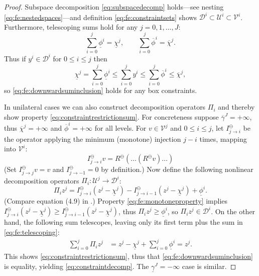 \documentclass[review,hidelinks,onefignum,onetabnum]{siamart220329}
\newcommand{\cV}{\mathcal{V}}
\newcommand{\minR}{R^{\bm{\ominus}}}
\begin{document}
\begin{proof}  Subspace decomposition \eqref{eq:subspacedecomp} holds---see nesting \eqref{eq:fe:nestedspaces}---and definition \eqref{eq:fe:constraintsets} shows $\mathcal{D}^i \subset \mathcal{U}^i \subset \cV^i$.  Furthermore, telescoping sums hold for any $j=0,1,\dots,J$:
\begin{equation}
\sum_{i=0}^j \underline{\phi}^i = \underline{\chi}^j, \qquad \sum_{i=0}^j \overline{\phi}^i = \overline{\chi}^j.  \label{eq:fe:telescoping}
\end{equation}
Thus if $y^i \in \mathcal{D}^i$ for $0 \le i \le j$ then
\begin{equation}
\underline{\chi}^j = \sum_{i=0}^j \underline{\phi}^i \le \sum_{i=0}^j y^i \le \sum_{i=0}^j \overline{\phi}^i \le \overline{\chi}^j, \label{eq:fe:lemmaordering}
\end{equation}
so \eqref{eq:fe:downwardsuminclusion} holds for any box constraints.

In unilateral cases we can also construct decomposition operators $\Pi_i$ and thereby show property \eqref{eq:constraintrestrictionsum}.  For concreteness suppose $\overline{\gamma}^J=+\infty$, thus $\overline{\chi}^j=+\infty$ and $\overline{\phi}^i = +\infty$ for all levels.  For $v\in \mathcal{V}^j$ and $0\le i \le j$, let $I_{j\to i}^\ominus$ be the operator applying the minimum (monotone) injection $j-i$ times, mapping into $\mathcal{V}^i$:
\begin{equation}
I_{j\to i}^\ominus v = \minR(\dots(\minR v)\dots)  \label{eq:fe:minimummaps}
\end{equation}
(Set $I_{j\to j}^\ominus v = v$ and $I_{j\to -1}^\ominus=0$ by definition.)  Now define the following nonlinear decomposition operators $\Pi_i:\mathcal{U}^j \to \mathcal{D}^i$:
\begin{equation}
\Pi_i z^j = I_{j\to i}^\ominus(z^j - \underline{\chi}^j) - I_{j\to i-1}^\ominus(z^j - \underline{\chi}^j) + \underline{\phi}^i.  \label{eq:fe:unilateraldecompositionoperator}
\end{equation}
(Compare equation (4.9) in \cite{GraeserKornhuber2009}.)  Property \eqref{eq:fe:monotoneproperty} implies $I_{j\to i}^\ominus(z^j - \underline{\chi}^j) \ge I_{j\to i-1}^\ominus(z^j - \underline{\chi}^j)$, thus $\Pi_i z^j \ge \underline{\phi}^i$, so $\Pi_i z^j \in \mathcal{D}^i$.  On the other hand, the following sum telescopes, leaving only its first term plus the sum in \eqref{eq:fe:telescoping}:
\begin{align*}
\sum_{i=0}^j \Pi_i z^j &= z^j - \underline{\chi}^j + \sum_{i=0}^j \underline{\phi}^i = z^j.
\end{align*}
This shows \eqref{eq:constraintrestrictionsum}, thus that \eqref{eq:fe:downwardsuminclusion} is equality, yielding \eqref{eq:constraintdecomp}.  The $\underline{\gamma}^J=-\infty$ case is similar.
\end{proof}
\end{document}
